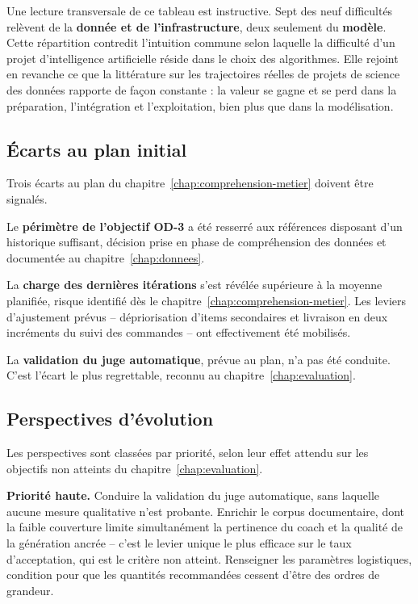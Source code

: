 Une lecture transversale de ce tableau est instructive. Sept des neuf difficultés relèvent de la \textbf{donnée et de l'infrastructure}, deux seulement du \textbf{modèle}. Cette répartition contredit l'intuition commune selon laquelle la difficulté d'un projet d'intelligence artificielle réside dans le choix des algorithmes. Elle rejoint en revanche ce que la littérature sur les trajectoires réelles de projets de science des données rapporte de façon constante \cite{martinez2021crisp} : la valeur se gagne et se perd dans la préparation, l'intégration et l'exploitation, bien plus que dans la modélisation.

\subsection{Écarts au plan initial}

Trois écarts au plan du chapitre~\ref{chap:comprehension-metier} doivent être signalés.

Le \textbf{périmètre de l'objectif OD-3} a été resserré aux références disposant d'un historique suffisant, décision prise en phase de compréhension des données et documentée au chapitre~\ref{chap:donnees}.

La \textbf{charge des dernières itérations} s'est révélée supérieure à la moyenne planifiée, risque identifié dès le chapitre~\ref{chap:comprehension-metier}. Les leviers d'ajustement prévus -- dépriorisation d'items secondaires et livraison en deux incréments du suivi des commandes -- ont effectivement été mobilisés.

La \textbf{validation du juge automatique}, prévue au plan, n'a pas été conduite. C'est l'écart le plus regrettable, reconnu au chapitre~\ref{chap:evaluation}.

\subsection{Perspectives d'évolution}

Les perspectives sont classées par priorité, selon leur effet attendu sur les objectifs non atteints du chapitre~\ref{chap:evaluation}.

\textbf{Priorité haute.} Conduire la validation du juge automatique, sans laquelle aucune mesure qualitative n'est probante. Enrichir le corpus documentaire, dont la faible couverture limite simultanément la pertinence du coach et la qualité de la génération ancrée -- c'est le levier unique le plus efficace sur le taux d'acceptation, qui est le critère non atteint. Renseigner les paramètres logistiques, condition pour que les quantités recommandées cessent d'être des ordres de grandeur.

